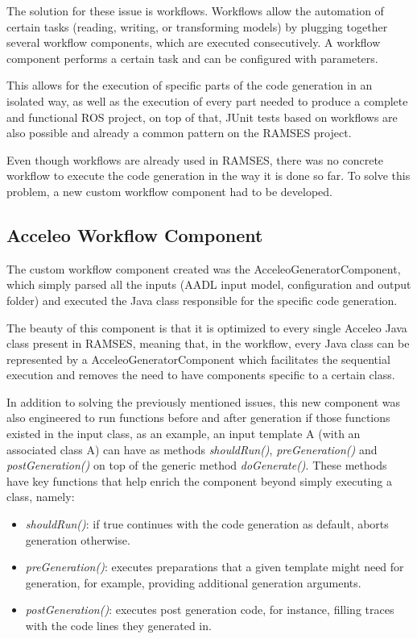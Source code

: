 The solution for these issue is workflows. Workflows allow the automation of certain tasks (reading, writing, or transforming models) by plugging together several workflow components, which are executed consecutively. A workflow component performs a certain task and can be configured with parameters.

This allows for the execution of specific parts of the code generation in an isolated way, as well as the execution of every part needed to produce a complete and functional \gls{ROS} project, on top of that, \gls{JUnit} tests based on workflows are also possible and already a common pattern on the \gls{RAMSES} project.

Even though workflows are already used in \gls{RAMSES}, there was no concrete workflow to execute the code generation in the way it is done so far. To solve this problem, a new custom workflow component had to be developed.

\subsection{Acceleo Workflow Component}
\label{sec:workflows_acceleo}

The custom workflow component created was the AcceleoGeneratorComponent, which simply parsed all the inputs (AADL input model, configuration and output folder) and executed the Java class responsible for the specific code generation.

The beauty of this component is that it is optimized to every single Acceleo Java class present in \gls{RAMSES}, meaning that, in the workflow, every Java class can be represented by a AcceleoGeneratorComponent which facilitates the sequential execution and removes the need to have components specific to a certain class.

In addition to solving the previously mentioned issues, this new component was also engineered to run functions before and after generation if those functions existed in the input class, as an example, an input template A (with an associated class A) can have as methods \textit{shouldRun()}, \textit{preGeneration()} and \textit{postGeneration()} on top of the generic method \textit{doGenerate()}. These methods have key functions that help enrich the component beyond simply executing a class, namely:

\begin{itemize} 
	\item \textit{shouldRun()}: if true continues with the code generation as default, aborts generation otherwise.
	\item \textit{preGeneration()}: executes preparations that a given template might need for generation, for example, providing additional generation arguments.
	\item \textit{postGeneration()}: executes post generation code, for instance, filling traces with the code lines they generated in.
\end{itemize}

